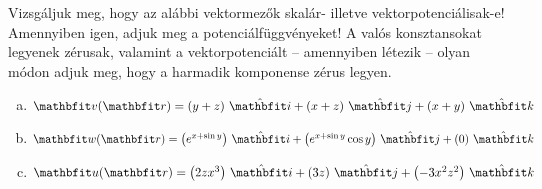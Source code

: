 \documentclass[lang=magyar]{math-handout}
\begin{document}
\begin{exercise}{%
    Vizsgáljuk meg, hogy az alábbi vektormezők skalár- illetve
    vektorpotenciálisak-e! Amennyiben igen, adjuk meg a potenciálfüggvényeket!
    A valós konsztansokat legyenek zérusak, valamint a vektorpotenciált --
    amennyiben létezik -- olyan módon adjuk meg, hogy a harmadik komponense
    zérus legyen.
  }
  \begin{enumerate}[a)]
    \item $\rvec v(\rvec r) = \ijk{y + z}{x + z}{x + y}$
    \item $\rvec w(\rvec r) = \ijk{e^{x + \sin y}}{e^{x + \sin y} \cos y}{0}$
    \item $\rvec u(\rvec r) = \ijk{2zx^3}{3z}{-3x^2z^2}$
  \end{enumerate}

\end{exercise}
\end{document}
